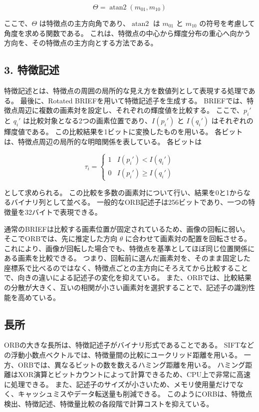 \documentclass[11pt,a4paper]{ltjsarticle}
\begin{document}
\begin{equation}
\Theta=\operatorname{atan2}(m_{01},m_{10})
\label{eq:orientation}
\end{equation}

ここで、$\Theta$ は特徴点の主方向角であり、$\operatorname{atan2}$ は $m_{01}$ と $m_{10}$ の符号を考慮して角度を求める関数である。
これは、特徴点の中心から輝度分布の重心へ向かう方向を、その特徴点の主方向とする方法である。

\subsection*{3. 特徴記述}

特徴記述とは、特徴点の周囲の局所的な見え方を数値列として表現する処理である。
最後に、Rotated BRIEFを用いて特徴記述子を生成する。
BRIEFでは、特徴点周辺に複数の画素対を設定し、それぞれの輝度値を比較する。
ここで、$p_i'$ と $q_i'$ は比較対象となる2つの画素位置であり、$I(p_i')$ と $I(q_i')$ はそれぞれの輝度値である。
この比較結果を1ビットに変換したものを用いる。
各ビットは、特徴点周辺の局所的な明暗関係を表している。
各ビットは

\begin{equation}
\tau_i=
\begin{cases}
1 & I(p_i')<I(q_i') \\
0 & I(p_i')\geq I(q_i')
\end{cases}
\label{eq:brief-bit}
\end{equation}

として求められる。
この比較を多数の画素対について行い、結果を0と1からなるバイナリ列として並べる。
一般的なORB記述子は256ビットであり、一つの特徴量を32バイトで表現できる。

通常のBRIEFは比較する画素位置が固定されているため、画像の回転に弱い。
そこでORBでは、先に推定した方向 $\theta$ に合わせて画素対の配置を回転させる。
これにより、画像が回転した場合でも、特徴点を基準としてほぼ同じ位置関係にある画素を比較できる。
つまり、回転前に選んだ画素対を、そのまま固定した座標系で比べるのではなく、特徴点ごとの主方向にそろえてから比較することで、向きの違いによる記述子の変化を抑えている。
また、ORBでは、比較結果の分散が大きく、互いの相関が小さい画素対を選択することで、記述子の識別性能を高めている。

\subsection*{長所}

ORBの大きな長所は、特徴記述子がバイナリ形式であることである。
SIFTなどの浮動小数点ベクトルでは、特徴量間の比較にユークリッド距離を用いる。
一方、ORBでは、異なるビットの数を数えるハミング距離を用いる。
ハミング距離はXOR演算とビットカウントによって計算できるため、CPU上で非常に高速に処理できる。
また、記述子のサイズが小さいため、メモリ使用量だけでなく、キャッシュミスやデータ転送量も削減できる。
このようにORBは、特徴点検出、特徴記述、特徴量比較の各段階で計算コストを抑えている。
\end{document}

